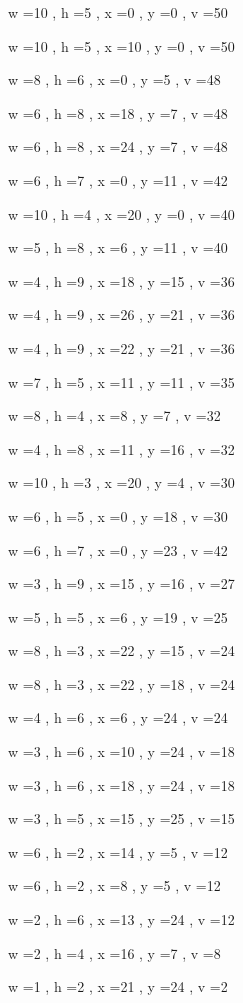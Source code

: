 \documentclass[11pt]{article}
\begin{document}
w =10 , h =5 , x =0 , y =0 , v =50
\par
w =10 , h =5 , x =10 , y =0 , v =50
\par
w =8 , h =6 , x =0 , y =5 , v =48
\par
w =6 , h =8 , x =18 , y =7 , v =48
\par
w =6 , h =8 , x =24 , y =7 , v =48
\par
w =6 , h =7 , x =0 , y =11 , v =42
\par
w =10 , h =4 , x =20 , y =0 , v =40
\par
w =5 , h =8 , x =6 , y =11 , v =40
\par
w =4 , h =9 , x =18 , y =15 , v =36
\par
w =4 , h =9 , x =26 , y =21 , v =36
\par
w =4 , h =9 , x =22 , y =21 , v =36
\par
w =7 , h =5 , x =11 , y =11 , v =35
\par
w =8 , h =4 , x =8 , y =7 , v =32
\par
w =4 , h =8 , x =11 , y =16 , v =32
\par
w =10 , h =3 , x =20 , y =4 , v =30
\par
w =6 , h =5 , x =0 , y =18 , v =30
\par
w =6 , h =7 , x =0 , y =23 , v =42
\par
w =3 , h =9 , x =15 , y =16 , v =27
\par
w =5 , h =5 , x =6 , y =19 , v =25
\par
w =8 , h =3 , x =22 , y =15 , v =24
\par
w =8 , h =3 , x =22 , y =18 , v =24
\par
w =4 , h =6 , x =6 , y =24 , v =24
\par
w =3 , h =6 , x =10 , y =24 , v =18
\par
w =3 , h =6 , x =18 , y =24 , v =18
\par
w =3 , h =5 , x =15 , y =25 , v =15
\par
w =6 , h =2 , x =14 , y =5 , v =12
\par
w =6 , h =2 , x =8 , y =5 , v =12
\par
w =2 , h =6 , x =13 , y =24 , v =12
\par
w =2 , h =4 , x =16 , y =7 , v =8
\par
w =1 , h =2 , x =21 , y =24 , v =2
\par
\newpage
\end{document}
